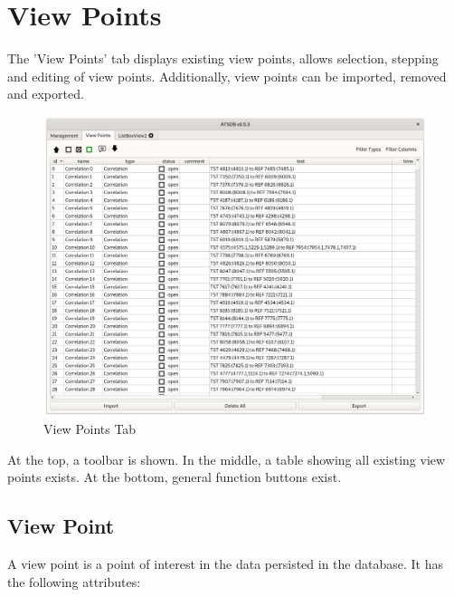\chapter{View Points}
\label{sec:view_points} 

The 'View Points' tab displays existing view points, allows selection, stepping and editing of view points. Additionally, view points can be imported, removed and exported.

\begin{figure}[H]
    \hspace*{-2.5cm}
    \includegraphics[width=19cm]{../screenshots/view_points.png}
  \caption{View Points Tab}
\end{figure}

At the top, a toolbar is shown. In the middle, a table showing all existing view points exists. At the bottom, general function buttons exist. \\

\section{View Point}

A view point is a point of interest in the data persisted in the database. It has the following attributes:

